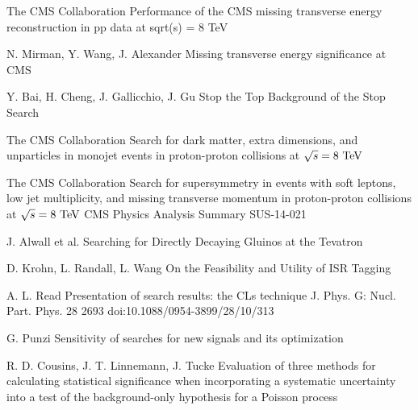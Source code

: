 \begin{thebibliography}{2}
             {The CMS Collaboration}
             {Performance of the CMS missing transverse energy reconstruction in pp data at sqrt(s) = 8 TeV}
             {}


             {N. Mirman, Y. Wang, J. Alexander}
             {Missing transverse energy significance at CMS}
             {}

             {Y. Bai, H. Cheng, J. Gallicchio, J. Gu}
             {Stop the Top Background of the Stop Search}
             {}


             {The CMS Collaboration}
             {Search for dark matter, extra dimensions, and unparticles in monojet events in proton-proton collisions at $\sqrt{s} = 8~\text{TeV}$}
             {}

             {The CMS Collaboration}
             {Search for supersymmetry in events with soft leptons, low
             jet multiplicity, and missing transverse momentum in
             proton-proton collisions at $\sqrt{s} = 8~\text{TeV}$}
             {CMS Physics Analysis Summary SUS-14-021}

             {J. Alwall et al.}
             {Searching for Directly Decaying Gluinos at the Tevatron}
             {}

             {D. Krohn, L. Randall, L. Wang}
             {On the Feasibility and Utility of ISR Tagging}
             {}


             {A. L. Read}
             {Presentation of search results: the CLs technique}
             {J. Phys. G: Nucl. Part. Phys. 28 2693 doi:10.1088/0954-3899/28/10/313}

             {G. Punzi}
             {Sensitivity of searches for new signals and its optimization}
             {}

             {R. D. Cousins, J. T. Linnemann, J. Tucke}
             {Evaluation of three methods for calculating
             statistical significance when incorporating a
             systematic uncertainty into a test of the
             background-only hypothesis for a Poisson
             process}
             {}


\end{thebibliography}
